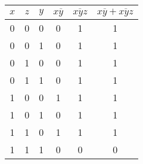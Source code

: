 \documentclass{article}
\begin{document}
\begin{enumerate}
\begin{enumerate}
		            \begin{center}
			            \begin{tabular}{|c c c c c c|}
				            \hline
				            \( x \) & \( z \) & \( y \) & \( x \overline{y}  \) & \( \overline{xyz}  \) & \( x \overline{y} + \overline{xyz} \) \\ [0.5ex]
				            \hline\hline
				            0       & 0       & 0       & 0                     & 1                     & 1                                     \\ \hline
				            0       & 0       & 1       & 0                     & 1                     & 1                                     \\
				            \hline
				            0       & 1       & 0       & 0                     & 1                     & 1                                     \\
				            \hline
				            0       & 1       & 1       & 0                     & 1                     & 1                                     \\
				            \hline
				            1       & 0       & 0       & 1                     & 1                     & 1                                     \\
				            \hline
				            1       & 0       & 1       & 0                     & 1                     & 1                                     \\
				            \hline
				            1       & 1       & 0       & 1                     & 1                     & 1                                     \\
				            \hline
				            1       & 1       & 1       & 0                     & 0                     & 0                                     \\
				            \hline
			            \end{tabular}
		            \end{center}

	      \end{enumerate}


\end{enumerate}
\end{document}
